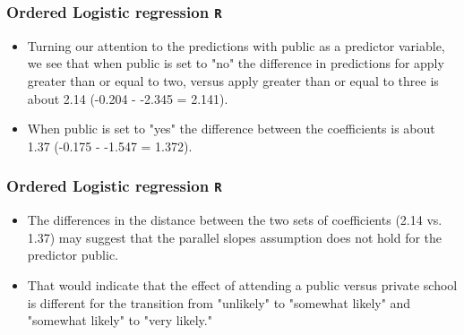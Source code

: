 \documentclass[00-GLMregslides.tex]{subfiles}
\begin{document}
	\begin{frame}[fragile]
		\frametitle{Ordered Logistic regression \texttt{R} }
	
	\Large
\begin{itemize}
\item Turning our attention to the predictions with public as a predictor variable, we see that when public is set to "no" the difference in predictions for apply greater than or equal to two, versus apply greater than or equal to three is about 2.14 (-0.204 - -2.345 = 2.141). 
\item When public is set to "yes" the difference between the coefficients is about 1.37 (-0.175 - -1.547 = 1.372).
\end{itemize}
\end{frame}
	
	\begin{frame}[fragile]
		\frametitle{Ordered Logistic regression \texttt{R} }
		\Large
\begin{itemize}
\item  The differences in the distance between the two sets of coefficients (2.14 vs. 1.37) may suggest that the parallel slopes assumption does not hold for the predictor public. 
\item That would indicate that the effect of attending a public versus private school is different for the transition from "unlikely" to "somewhat likely" and "somewhat likely" to "very likely."
\end{itemize}
\end{frame}
	
\end{document}
